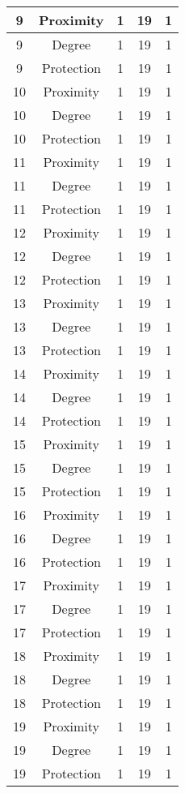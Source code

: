 \documentclass[results.tex]{subfiles}
\begin{document}
\begin{center}
\begin{tabular}{| c || c | c | c | c |}
    \hline
    9 & Proximity & 1 & 19 & 1 \\
    \hline
    9 & Degree & 1 & 19 & 1 \\
    \hline
    9 & Protection & 1 & 19 & 1 \\
    \hline
    10 & Proximity & 1 & 19 & 1 \\
    \hline
    10 & Degree & 1 & 19 & 1 \\
    \hline
    10 & Protection & 1 & 19 & 1 \\
    \hline
    11 & Proximity & 1 & 19 & 1 \\
    \hline
    11 & Degree & 1 & 19 & 1 \\
    \hline
    11 & Protection & 1 & 19 & 1 \\
    \hline
    12 & Proximity & 1 & 19 & 1 \\
    \hline
    12 & Degree & 1 & 19 & 1 \\
    \hline
    12 & Protection & 1 & 19 & 1 \\
    \hline
    13 & Proximity & 1 & 19 & 1 \\
    \hline
    13 & Degree & 1 & 19 & 1 \\
    \hline
    13 & Protection & 1 & 19 & 1 \\
    \hline
    14 & Proximity & 1 & 19 & 1 \\
    \hline
    14 & Degree & 1 & 19 & 1 \\
    \hline
    14 & Protection & 1 & 19 & 1 \\
    \hline
    15 & Proximity & 1 & 19 & 1 \\
    \hline
    15 & Degree & 1 & 19 & 1 \\
    \hline
    15 & Protection & 1 & 19 & 1 \\
    \hline
    16 & Proximity & 1 & 19 & 1 \\
    \hline
    16 & Degree & 1 & 19 & 1 \\
    \hline
    16 & Protection & 1 & 19 & 1 \\
    \hline
    17 & Proximity & 1 & 19 & 1 \\
    \hline
    17 & Degree & 1 & 19 & 1 \\
    \hline
    17 & Protection & 1 & 19 & 1 \\
    \hline
    18 & Proximity & 1 & 19 & 1 \\
    \hline
    18 & Degree & 1 & 19 & 1 \\
    \hline
    18 & Protection & 1 & 19 & 1 \\
    \hline
    19 & Proximity & 1 & 19 & 1 \\
    \hline
    19 & Degree & 1 & 19 & 1 \\
    \hline
    19 & Protection & 1 & 19 & 1 \\
    \hline
  \end{tabular}
\end{center}
\end{document}

